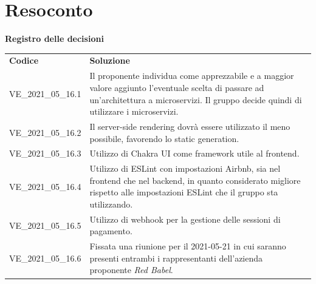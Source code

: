 \documentclass[a4paper]{article}
\begin{document}
\section{Resoconto}
\begin{center}
    \textbf{\Large Registro delle decisioni}\\
    \vspace{10px}
    \begin{table}[h!]
        \centering
        \renewcommand{\arraystretch}{1.8}
        \begin{tabular}{p{200px} p{200px}}
            \rowcolor{logo!70} \textbf{Codice} & \textbf{Soluzione}                                                                                                                                                                           \\
            VE\_2021\_05\_16.1                 & Il proponente individua come apprezzabile e a maggior valore aggiunto l'eventuale scelta di passare ad un'architettura a microservizi. Il gruppo decide quindi di utilizzare i microservizi. \\
            VE\_2021\_05\_16.2                 & Il server-side rendering dovrà essere utilizzato il meno possibile, favorendo lo static generation.                                                                                          \\
            VE\_2021\_05\_16.3                 & Utilizzo di Chakra UI come framework utile al frontend.                                                                                                                                      \\
            VE\_2021\_05\_16.4                 & Utilizzo di ESLint con impostazioni Airbnb, sia nel frontend che nel backend, in quanto considerato migliore rispetto alle impostazioni ESLint che il gruppo sta utilizzando.                \\
            VE\_2021\_05\_16.5                 & Utilizzo di webhook per la gestione delle sessioni di pagamento.                                                                                                                             \\
            VE\_2021\_05\_16.6                 & Fissata una riunione per il 2021-05-21 in cui saranno presenti entrambi i rappresentanti dell'azienda proponente \textit{Red Babel}.
        \end{tabular}
    \end{table}
\end{center}
\end{document}
